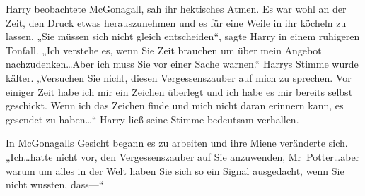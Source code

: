 Harry beobachtete McGonagall, sah ihr hektisches Atmen. Es war wohl an der Zeit, den Druck etwas herauszunehmen und es für eine Weile in ihr köcheln zu lassen. „Sie müssen sich nicht gleich entscheiden“, sagte Harry in einem ruhigeren Tonfall. „Ich verstehe es, wenn Sie Zeit brauchen um über mein Angebot nachzudenken…Aber ich muss Sie vor einer Sache warnen.“ Harrys Stimme wurde kälter. „Versuchen Sie nicht, diesen Vergessenszauber auf mich zu sprechen. Vor einiger Zeit habe ich mir ein Zeichen überlegt und ich habe es mir bereits selbst geschickt. Wenn ich das Zeichen finde und mich nicht daran erinnern kann, es gesendet zu haben…“ Harry ließ seine Stimme bedeutsam verhallen.

In McGonagalls Gesicht begann es zu arbeiten und ihre Miene veränderte sich. „Ich…hatte nicht vor, den Vergessenszauber auf Sie anzuwenden, Mr~Potter…aber warum um alles in der Welt haben Sie sich so ein Signal ausgedacht, wenn Sie nicht wussten, dass—“

